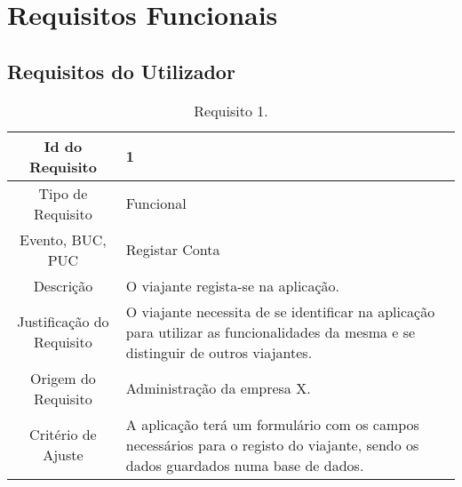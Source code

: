 \chapter{Requisitos Funcionais}

\section{Requisitos do Utilizador}

\begin{table}[H]
\begin{center}
  \begin{tabularx}{\textwidth}{ | c | X | }
    \hline 
    Id do Requisito & 1 \\

    \hline
    Tipo de Requisito & Funcional \\
    
    \hline
    Evento, BUC, PUC & Registar Conta \\
    
    \hline
    Descrição & O viajante regista-se na aplicação. \\
    
    \hline
    Justificação do Requisito &  O viajante necessita de se identificar na aplicação para utilizar as funcionalidades da mesma e se distinguir de outros viajantes. \\
    \hline
    Origem do Requisito & Administração da empresa X. \\
    
    \hline
    Critério de Ajuste & A aplicação terá um formulário com os campos necessários para o registo do viajante, sendo os dados guardados numa base de dados.\\
    
    \hline
  \end{tabularx}
  \caption{Requisito 1.} \label{tab:r1}
\end{center}
\end{table}

